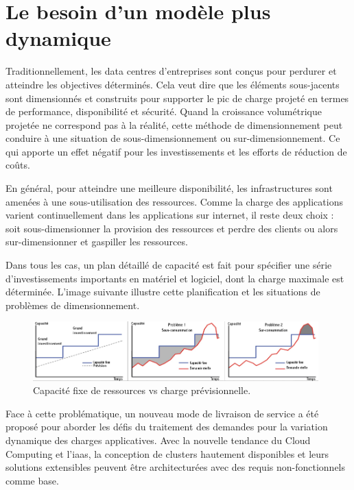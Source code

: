 \section{Le besoin d'un modèle plus dynamique}


Traditionnellement, les data centres d'entreprises sont conçus pour perdurer et atteindre les objectives déterminés. Cela veut dire que les éléments sous-jacents sont dimensionnés et construits pour supporter le pic de charge projeté en termes de performance, disponibilité et sécurité. Quand la croissance volumétrique projetée ne correspond pas à la réalité, cette méthode de dimensionnement peut conduire à une situation de sous-dimensionnement ou sur-dimensionnement. Ce qui apporte un effet négatif pour les investissements et les efforts de réduction de coûts.

En général, pour atteindre une meilleure disponibilité, les infrastructures sont amenées à une sous-utilisation des ressources. Comme la charge des applications varient continuellement dans les applications sur internet, il reste deux choix : soit sous-dimensionner la provision des ressources et perdre des clients ou alors sur-dimensionner et gaspiller les ressources. 

Dans tous les cas, un plan détaillé de capacité est fait pour spécifier une série d'investissements importants en matériel et logiciel, dont la charge maximale est déterminée. L'image suivante illustre cette planification et les situations de problèmes de dimensionnement.\\


\begin{figure}[h]
\begin{center}
\includegraphics[width=0.98\textwidth]{images/fixed_capacity_load_prediction_T} 
\caption{Capacité fixe de ressources vs charge prévisionnelle. \cite{awsScaling}}
\end{center}
\end{figure}

Face à cette problématique, un nouveau mode de livraison de service a été proposé pour aborder les défis du traitement des demandes pour la variation dynamique des charges applicatives. Avec la nouvelle tendance du Cloud Computing et l'\gls{iaas}, la conception de \glspl{cluster} hautement disponibles et leurs solutions extensibles peuvent être architecturées avec des requis non-fonctionnels comme base. 

